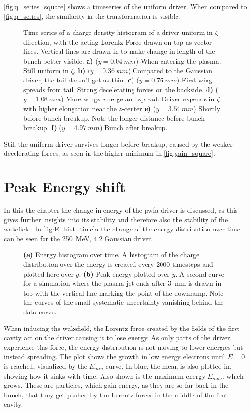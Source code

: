 \documentclass[bachelor_thesis]{subfiles}
\begin{document}
\autoref{fig:q_series_square} shows a timeseries of the uniform driver. When compared to \autoref{fig:q_series}, the similarity in the transformation is visible.
\begin{figure}
	\centering
	
	\caption{Time series of a charge density histogram of a driver uniform in $\zeta$-direction, with the acting Lorentz Force drawn on top as vector lines. Vertical lines are drawn in to make change in length of the bunch better visible. 
	\textbf{a)} ($y=\qty{0.04}{mm}$) When entering the plasma. Still uniform in $\zeta$.
	\textbf{b)} ($y=\qty{0.36}{mm}$) Compared to the Gaussian driver, the tail doesn't get as thin.
	\textbf{c)} ($y=\qty{0.76}{mm}$) First wing spreads from tail. Strong decelerating forces on the backside.
	\textbf{d)} ($y=\qty{1.08}{mm}$) More wings emerge and spread. Driver expends in $\zeta$ with higher elongation near the $z$-center
	\textbf{e)} ($y=\qty{3.54}{mm}$) Shortly before bunch breakup. Note the longer distance before bunch breakup.
	\textbf{f)} ($y=\qty{4.97}{mm}$) Bunch after breakup.}
	\label{fig:q_series_square}
\end{figure}
Still the uniform driver survives longer before breakup, caused by the weaker decelerating forces, as seen in the higher minimum in \autoref{fig:gain_square}.


\section{Peak Energy shift} \label{chap:E_shift}
In this the chapter the change in energy of the \gls{pwfa} driver is discussed, as this gives further insights into its stability and therefore also the stability of the wakefield.
In \autoref{fig:E_hist_time}a the change of the energy distribution over time can be seen for the \qty{250}{\MeV}, \qty{4.2}{\mrad} Gaussian driver.
\begin{figure}
	\centering
	
	\caption{
	\textbf{(a)} Energy histogram over time. A histogram of the charge distribution over the energy is created every 2000 timesteps and plotted here over $y$.
	\textbf{(b)} Peak energy plotted over $y$. A second curve for a simulation where the plasma jet ends after \qty{3}{\mm} is drawn in too with the vertical line marking the point of the downramp. Note the curves of the small systematic uncertainty vanishing behind the data curve.}
	\label{fig:E_hist_time}
\end{figure}
When inducing the wakefield, the Lorentz force created by the fields of the first cavity act on the driver causing it to lose energy. As only parts of the driver experience this force, the energy distribution is not moving to lower energies but instead spreading.
The plot shows the growth in low energy electrons until $E=0$ is reached, visualized by the $E_{min}$ curve. In blue, the mean is also plotted in, showing how it sinks with time. Also shown is the maximum energy $E_{max}$, which grows.
These are particles, which gain energy, as they are so far back in the bunch, that they get pushed by the Lorentz forces in the middle of the first cavity.
\end{document}
